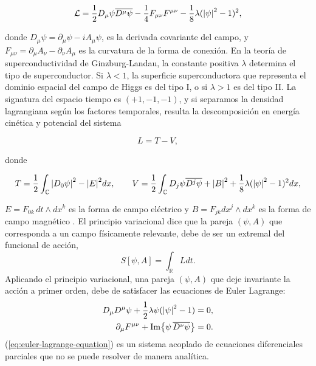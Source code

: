 \documentclass[spanish]{amsart}
\newcommand*{\R}{\mathbb{R}}
\newcommand*{\C}{\mathbb{C}}
\newcommand*{\del}{\partial}
\newcommand*{\lagrangian}{\mathcal{L}}
\begin{document}
\begin{equation}
\label{eq:GL-lagrangian}
\lagrangian = \frac{1}{2} D_{\mu}\psi\overline{D^{\mu}\psi} -
\frac{1}{4}F_{\mu\nu}F^{\mu\nu} - \frac{1}{8}\lambda (\abs{\psi}^2 - 1)^2,
\end{equation}

donde \(D_{\mu}\psi = \del_{\mu}\psi - iA_{\mu}\psi \), es la derivada
covariante del campo, y \(F_{\mu\nu} = \del_{\mu}A_{\nu} -
\del_{\nu}A_{\mu} \) es la curvatura de la forma de conexión. En la
teoría de superconductividad de Ginzburg-Landau, la constante positiva
\(\lambda \) determina el tipo de superconductor. Si \(\lambda < 1 \),
la superficie superconductora que representa el dominio espacial del
campo de Higgs es del tipo I, o si \(\lambda > 1 \) es del tipo II. La
signatura del espacio tiempo es \((+1, -1, -1) \), y si separamos la
densidad lagrangiana según los factores temporales, resulta la
descomposición en energía cinética y potencial del sistema
\cite{manton2004topological}

\[
L = T - V,
\]

donde

\begin{equation}
\label{eq:kinectic-energy}
T = \frac{1}{2}\int_{\C} \abs{D_0\psi}^2 - \abs{E}^2 dx, \qquad
V = \frac{1}{2}\int_{\C} D_j\psi\overline{D^j\psi} + \abs{B}^2 +
\frac{1}{8}\lambda(\abs{\psi}^2- 1)^2dx,
\end{equation}

\(E = F_{0k}\,dt\wedge dx^k \) es la forma de campo eléctrico y \(B =
F_{jk}dx^j\wedge dx^k\) es la forma de campo magnético
\cite{frankel_2011}. El principio
variacional \cite{giaquinta2004calculus} dice que la pareja \((\psi,
A) \) que corresponda a un
campo físicamente relevante, debe de ser un extremal del funcional de
acción,
\[
S[\psi, A] = \int_{\R}L dt.
\]
Aplicando el principio variacional, una pareja \((\psi, A) \) que deje
invariante la acción a primer orden, debe de satisfacer las ecuaciones
de Euler Lagrange:
\begin{equation}
  \label{eq:euler-lagrange-equation}
  \begin{split}
      D_{\mu}D^{\mu}\psi + \frac{1}{2}\lambda\psi(\abs{\psi}^2 - 1) &= 0,\\
  \del_{\mu}F^{\mu\nu} + \Im{\psi\,\overline{D^{\nu}\psi}} &= 0.
  \end{split}
\end{equation}
(\ref{eq:euler-lagrange-equation}) es un sistema acoplado de
ecuaciones diferenciales parciales que no se puede resolver de manera
analítica.
\end{document}
